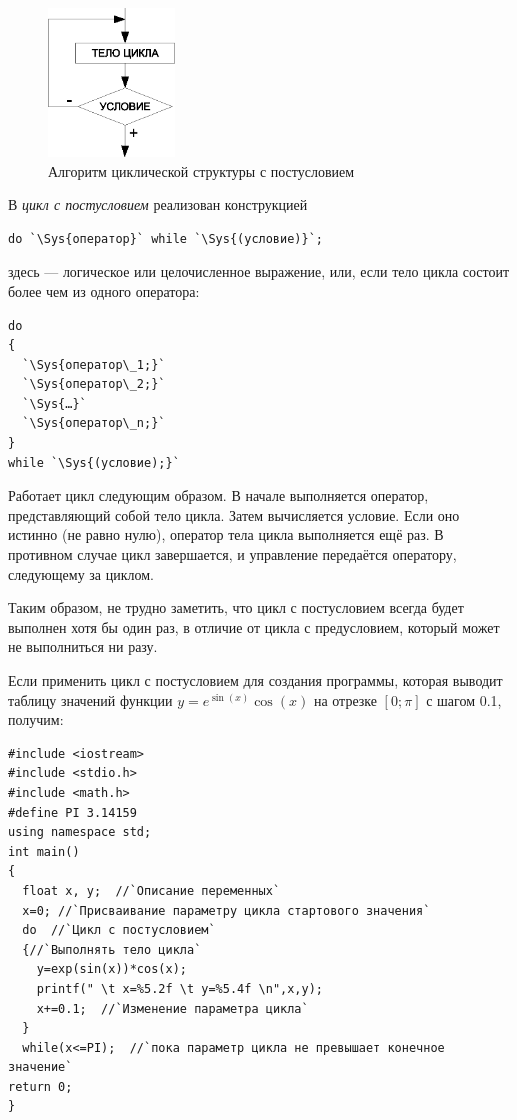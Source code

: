 \begin{figure}[htb]
\begin{center}
\includegraphics[width=0.3\textwidth]{img/ris_3_24}
\caption{Алгоритм циклической структуры с постусловием}
\label{ch03:refDrawing23}
\end{center}
\end{figure}

В  \emph{цикл с постусловием} реализован конструкцией
\begin{lstlisting}
do `\Sys{оператор}` while `\Sys{(условие)}`;
\end{lstlisting}
здесь  --- логическое или целочисленное выражение, или, если тело 
цикла состоит более чем из одного оператора:
\begin{lstlisting}
do
{
  `\Sys{оператор\_1;}`
  `\Sys{оператор\_2;}`
  `\Sys{…}`
  `\Sys{оператор\_n;}`
}
while `\Sys{(условие);}`
\end{lstlisting}

Работает цикл следующим образом. В начале выполняется оператор, представляющий собой тело цикла. Затем вычисляется
условие. Если оно истинно (не равно нулю), оператор тела цикла выполняется ещё раз. В противном случае цикл
завершается, и управление передаётся оператору, следующему за циклом.

Таким образом, не трудно заметить, что цикл с постусловием всегда будет выполнен хотя бы один раз, в отличие от цикла с
предусловием, который может не выполниться ни разу.

Если применить цикл с постусловием для создания программы, которая выводит таблицу 
значений функции  $y=e^{\sin (x)}\cos(x)$  на отрезке  $[0;\pi]$  с шагом 0.1, получим:

\begin{lstlisting}
#include <iostream>
#include <stdio.h>
#include <math.h>
#define PI 3.14159
using namespace std;
int main()
{
  float x, y;  //`Описание переменных`
  x=0; //`Присваивание параметру цикла стартового значения`
  do  //`Цикл с постусловием`
  {//`Выполнять тело цикла`
    y=exp(sin(x))*cos(x);
    printf(" \t x=%5.2f \t y=%5.4f \n",x,y);
    x+=0.1;  //`Изменение параметра цикла`
  }
  while(x<=PI);  //`пока параметр цикла не превышает конечное значение`
return 0;
}
\end{lstlisting}

